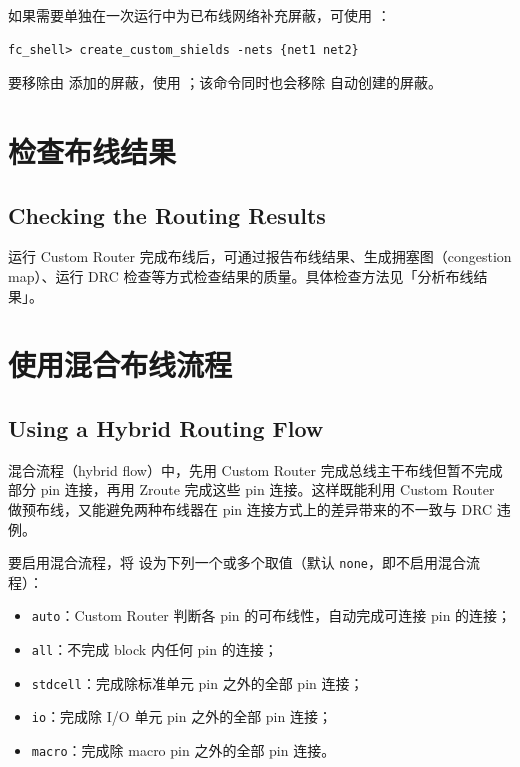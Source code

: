 如果需要单独在一次运行中为已布线网络补充屏蔽，可使用 ：

\begin{lstlisting}
fc_shell> create_custom_shields -nets {net1 net2}
\end{lstlisting}

要移除由  添加的屏蔽，使用 ；该命令同时也会移除  自动创建的屏蔽。

\section{检查布线结果}
\subsection*{Checking the Routing Results}

运行 Custom Router 完成布线后，可通过报告布线结果、生成拥塞图（congestion map）、运行 DRC 检查等方式检查结果的质量。具体检查方法见「分析布线结果」。

\section{使用混合布线流程}
\subsection*{Using a Hybrid Routing Flow}

混合流程（hybrid flow）中，先用 Custom Router 完成总线主干布线但暂不完成部分 pin 连接，再用 Zroute 完成这些 pin 连接。这样既能利用 Custom Router 做预布线，又能避免两种布线器在 pin 连接方式上的差异带来的不一致与 DRC 违例。

要启用混合流程，将  设为下列一个或多个取值（默认 \texttt{none}，即不启用混合流程）：
\begin{itemize}
  \item \texttt{auto}：Custom Router 判断各 pin 的可布线性，自动完成可连接 pin 的连接；
  \item \texttt{all}：不完成 block 内任何 pin 的连接；
  \item \texttt{stdcell}：完成除标准单元 pin 之外的全部 pin 连接；
  \item \texttt{io}：完成除 I/O 单元 pin 之外的全部 pin 连接；
  \item \texttt{macro}：完成除 macro pin 之外的全部 pin 连接。
\end{itemize}

